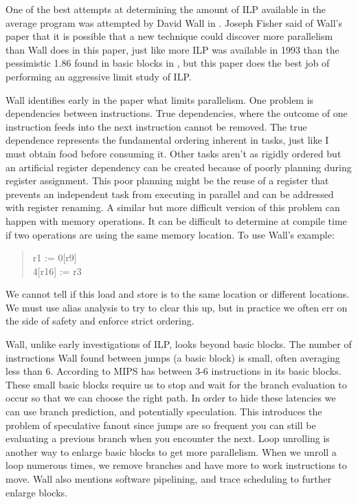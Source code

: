 \documentclass[12pt,twoside,letterpaper]{article}
\begin{document}
One of the best attempts at determining the amount of ILP available in the average program was attempted by David Wall in \cite{Wall:1991p191}. Joseph Fisher said of Wall's paper \cite{Rau:1992p211} that it is possible that a new technique could discover more parallelism than Wall does in this paper, just like more ILP was available in 1993 than the pessimistic 1.86 found in basic blocks in \cite{Tjaden:1970p214}, but this paper does the best job of performing an aggressive limit study of ILP.

Wall identifies early in the paper what limits parallelism. One problem is dependencies between instructions. True dependencies, where the outcome of one instruction feeds into the next instruction cannot be removed. The true dependence represents the fundamental ordering inherent in tasks, just like I must obtain food before consuming it. Other tasks aren't as rigidly ordered but an artificial register dependency can be created because of poorly planning during register assignment. This poor planning might be the reuse of a register that prevents an independent task from executing in parallel and can be addressed with register renaming. A similar but more difficult version of this problem can happen with memory operations. It can be difficult to determine at compile time if two operations are using the same memory location. To use Wall’s example:

\begin{quote}
r1 := 0[r9] \\
4[r16] := r3
\end{quote}

We cannot tell if this load and store is to the same location or different locations. We must use alias analysis to try to clear this up, but in practice we often err on the side of safety and enforce strict ordering.

Wall, unlike early investigations of ILP, looks beyond basic blocks. The number of instructions Wall found between jumps (a basic block) is small, often averaging less than 6. According to \cite{Hennessy:2003p277} MIPS has between 3-6 instructions in its basic blocks. These small basic blocks require us to stop and wait for the branch evaluation to occur so that we can choose the right path. In order to hide these latencies we can use branch prediction, and potentially speculation. This introduces the problem of speculative fanout since jumps are so frequent you can still be evaluating a previous branch when you encounter the next. Loop unrolling is another way to enlarge basic blocks to get more parallelism. When we unroll a loop numerous times, we remove branches and have more to work instructions to move. Wall also mentions software pipelining, and trace scheduling to further enlarge blocks.
\end{document}
